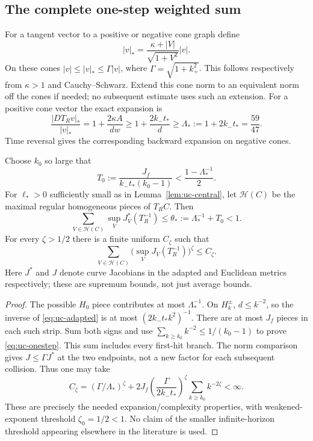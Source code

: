 \subsection{The complete one-step weighted sum}
For a tangent vector to a positive or negative cone graph define
\[
 |v|_* =\frac{\kappa+|V|}{\sqrt{1+V^2}}|v|.
\]
On these cones $|v|\le|v|_*\le\Gamma|v|$, where
$\Gamma=\sqrt{1+k_+^2}$. This follows respectively from $\kappa>1$
and Cauchy--Schwarz. Extend this cone norm to an equivalent norm off the
cones if needed; no subsequent estimate uses such an extension.
For a positive cone vector the exact expansion is
\begin{equation}\label{eq:uc-adapted}
 \frac{|DT_Rv|_*}{|v|_*}
   =1+\frac{2\kappa A}{dw}
   \ge1+\frac{2k_-t_*}{d}\ge\Lambda_*:=1+2k_-t_*=\frac{59}{47}.
\end{equation}
Time reversal gives the corresponding backward expansion on negative cones.

\begin{theorem}
\label{thm:uc-expansion}
Choose $k_0$ so large that
\begin{equation}\label{eq:uc-k0}
 T_0:=\frac{J_f}{k_-t_*(k_0-1)}<\frac{1-\Lambda_*^{-1}}2.
\end{equation}
For $\ell_*>0$ sufficiently small as in Lemma~\ref{lem:uc-central},
let $\mathcal H(C)$ be the maximal regular homogeneous pieces of $T_RC$.
Then
\begin{equation}\label{eq:uc-onestep}
 \sum_{V\in\mathcal H(C)}\sup_V J^*_V(T_R^{-1})
       \le\theta_*:=\Lambda_*^{-1}+T_0<1.
\end{equation}
For every $\zeta>1/2$ there is a finite uniform $C_\zeta$ such that
\begin{equation}\label{eq:uc-weakened}
 \sum_{V\in\mathcal H(C)}\bigl(\sup_V J_V(T_R^{-1})\bigr)^\zeta
                         \le C_\zeta.
\end{equation}
Here $J^*$ and $J$ denote curve Jacobians in the adapted and Euclidean
metrics respectively; these are supremum bounds, not just average bounds.
\end{theorem}
\begin{proof}
The possible $H_0$ piece contributes at most $\Lambda_*^{-1}$.
On $H_k^\pm$, $d\le k^{-2}$, so the inverse of
\eqref{eq:uc-adapted} is at most $(2k_-t_* k^2)^{-1}$.
There are at most $J_f$ pieces in each such strip. Sum both signs and use
$\sum_{k\ge k_0}k^{-2}\le1/(k_0-1)$ to prove
\eqref{eq:uc-onestep}. This sum includes every first-hit branch.
The norm comparison gives $J\le\Gamma J^*$ at the two endpoints,
not a new factor for each subsequent collision. Thus one may take
\[
 C_\zeta=(\Gamma/\Lambda_*)^\zeta+
 2J_f\left(\frac{\Gamma}{2k_-t_*}\right)^\zeta
                         \sum_{k\ge k_0}k^{-2\zeta}<\infty.
\]
These are precisely the needed expansion/complexity properties, with
weakened-exponent threshold $\zeta_0=1/2<1$. No claim of the smaller
infinite-horizon threshold appearing elsewhere in the literature is used.
\end{proof}

